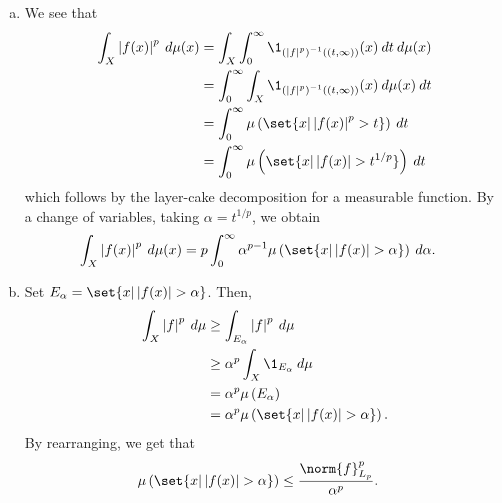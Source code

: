 \documentclass[10pt]{mypackage}
\begin{document}
\begin{enumerate}[(a)]
  \item We see that
    \begin{align*}
      \int_{X}^{} \left\vert f(x) \right\vert^{p}\:d\mu(x) &= \int_{X}^{} \int_{0}^{\infty} \1_{\left( \left\vert f \right\vert^{p} \right)^{-1}\left( \left( t,\infty \right) \right)}(x)\:dt\:d\mu(x)\\
                                                           &= \int_{0}^{\infty} \int_{X}^{} \1_{\left( \left\vert f \right\vert^{p} \right)^{-1}\left( \left( t,\infty \right) \right)}(x)\:d\mu(x)\:dt\\
                                                           &= \int_{0}^{\infty} \mu\left( \set{x | \left\vert f(x) \right\vert^{p} > t} \right)\:dt\\
                                                           &= \int_{0}^{\infty} \mu\left( \set{x | \left\vert f(x) \right\vert > t^{1/p}} \right)\:dt
    \end{align*}
    which follows by the layer-cake decomposition for a measurable function. By a change of variables, taking $\alpha = t^{1/p}$, we obtain
    \begin{align*}
      \int_{X}^{} \left\vert f(x) \right\vert^{p}\:d\mu(x) &= p \int_{0}^{\infty} \alpha^{p-1}\mu\left( \set{x | \left\vert f(x) \right\vert > \alpha} \right)\:d\alpha.
    \end{align*}
  \item Set $E_{\alpha} = \set{x | \left\vert f(x) \right\vert > \alpha}$. Then,
    \begin{align*}
      \int_{X}^{} \left\vert f \right\vert^{p}\:d\mu &\geq \int_{E_{\alpha}}^{} \left\vert f \right\vert^{p}\:d\mu\\
                                                     &\geq \alpha^{p} \int_{X}^{} \1_{E_{\alpha}}\:d\mu\\
                                                     &= \alpha^{p} \mu\left( E_{\alpha} \right)\\
                                                     &= \alpha^{p} \mu\left( \set{x | \left\vert f(x) \right\vert > \alpha} \right).
    \end{align*}
    By rearranging, we get that
    \begin{align*}
      \mu\left( \set{x | \left\vert f(x) \right\vert > \alpha} \right) &\leq \frac{\norm{f}_{L_p}^{p}}{\alpha^{p}}.
    \end{align*}
\end{enumerate}
\end{document}
